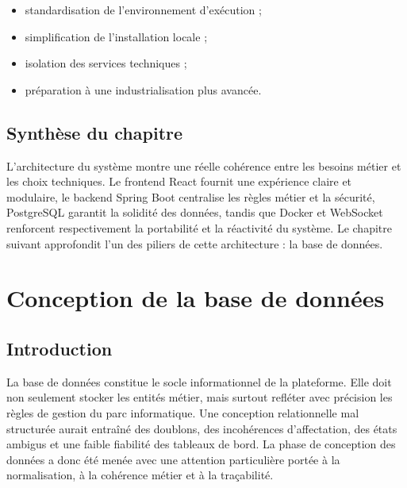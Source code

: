 ﻿\documentclass[12pt,a4paper,oneside]{report}
\begin{document}
\begin{methodbox}
\begin{itemize}
  \item standardisation de l'environnement d'exécution ;
  \item simplification de l'installation locale ;
  \item isolation des services techniques ;
  \item préparation à une industrialisation plus avancée.
\end{itemize}
\end{methodbox}

\section{Synthèse du chapitre}
L'architecture du système montre une réelle cohérence entre les besoins métier et les choix techniques. Le frontend React fournit une expérience claire et modulaire, le backend Spring Boot centralise les règles métier et la sécurité, PostgreSQL garantit la solidité des données, tandis que Docker et WebSocket renforcent respectivement la portabilité et la réactivité du système. Le chapitre suivant approfondit l'un des piliers de cette architecture : la base de données.












\chapter{Conception de la base de données}
\label{chap:database}

\section{Introduction}
La base de données constitue le socle informationnel de la plateforme. Elle doit non seulement stocker les entités métier, mais surtout refléter avec précision les règles de gestion du parc informatique. Une conception relationnelle mal structurée aurait entraîné des doublons, des incohérences d'affectation, des états ambigus et une faible fiabilité des tableaux de bord. La phase de conception des données a donc été menée avec une attention particulière portée à la normalisation, à la cohérence métier et à la traçabilité.
\end{document}
